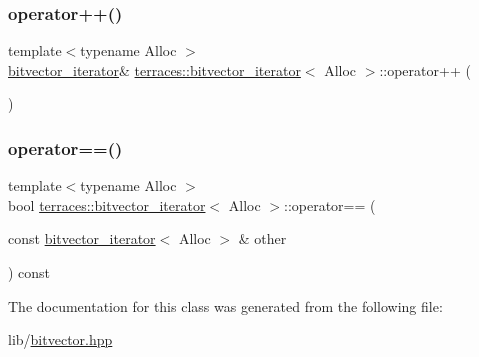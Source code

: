 \subsubsection{\texorpdfstring{operator++()}{operator++()}}
{\footnotesize\ttfamily template$<$typename Alloc $>$ \\
\hyperlink{classterraces_1_1bitvector__iterator}{bitvector\+\_\+iterator}\& \hyperlink{classterraces_1_1bitvector__iterator}{terraces\+::bitvector\+\_\+iterator}$<$ Alloc $>$\+::operator++ (\begin{DoxyParamCaption}{ }\end{DoxyParamCaption})\hspace{0.3cm}{\ttfamily [inline]}}

\mbox{\label{classterraces_1_1bitvector__iterator_a33e2ed2d92f8b24558f758ba340d384d}} 
\subsubsection{\texorpdfstring{operator==()}{operator==()}}
{\footnotesize\ttfamily template$<$typename Alloc $>$ \\
bool \hyperlink{classterraces_1_1bitvector__iterator}{terraces\+::bitvector\+\_\+iterator}$<$ Alloc $>$\+::operator== (\begin{DoxyParamCaption}\item[{const \hyperlink{classterraces_1_1bitvector__iterator}{bitvector\+\_\+iterator}$<$ Alloc $>$ \&}]{other }\end{DoxyParamCaption}) const\hspace{0.3cm}{\ttfamily [inline]}}



The documentation for this class was generated from the following file\+:\begin{DoxyCompactItemize}
\item 
lib/\hyperlink{bitvector_8hpp}{bitvector.\+hpp}\end{DoxyCompactItemize}
